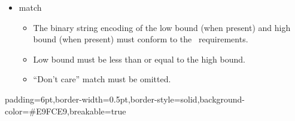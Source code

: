 \documentclass[11pt]{article}
\begin{document}
{%
\begin{itemize}[noitemsep,topsep=\mdcompacttopsep]%

\item{} match

\begin{itemize}[noitemsep,topsep=\mdcompacttopsep]%

\item{}The binary string encoding of the low bound (when present) and high bound
(when present) must conform to the~
requirements.%

\item{}Low bound must be less than or equal to the high bound.%

\item{}\textquotedblleft{}Don't care\textquotedblright{} match must be omitted.%
\end{itemize}%
\end{itemize}%

\begin{mdbmargintb}{6pt}{6pt}%
\begin{mdblock}{padding=6pt,border-width=0.5pt,border-style=solid,background-color=\#E9FCE9,breakable=true}%
\begin{mdpre}%
\end{mdpre}%
\end{mdblock}%
\end{mdbmargintb}%

\begin{itemize}[noitemsep,topsep=\mdcompacttopsep]%


\end{itemize}}
\end{document}
